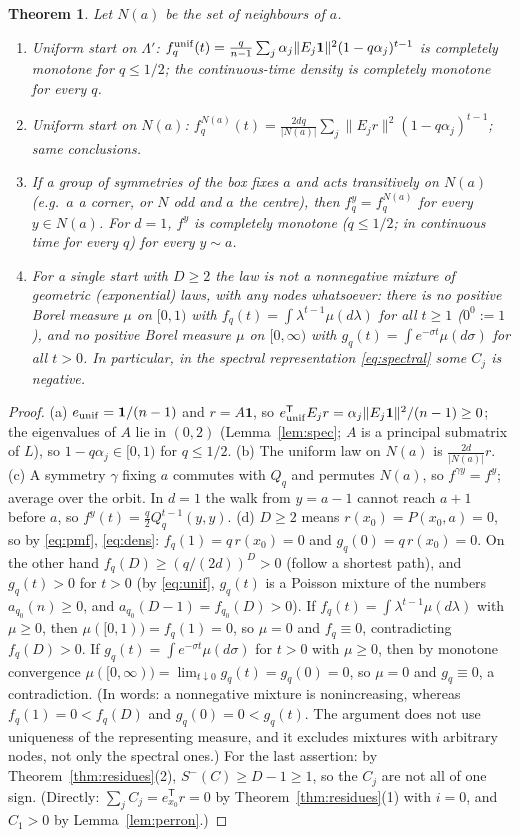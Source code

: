 \documentclass[11pt,a4paper]{article}
\newtheorem{theorem}{Theorem}[section]
\theoremstyle{definition}
\newcommand{\one}{\mathbf 1}
\newcommand{\Sm}{S^{-}}
\newcommand{\T}{^{\mathsf T}}
\begin{document}
\begin{theorem}\label{thm:cm}
Let $N(a)$ be the set of neighbours of $a$.
\begin{enumerate}
\item[(a)] Uniform start on $\Lambda'$: $f_q^{\rm unif}(t)=\frac q{n-1}\sum_j\alpha_j\|E_j\one\|^2(1-q\alpha_j)^{t-1}$ is completely monotone for $q\le1/2$; the continuous-time density is completely monotone for every $q$.
\item[(b)] Uniform start on $N(a)$: $f_q^{N(a)}(t)=\frac{2dq}{|N(a)|}\sum_j\|E_jr\|^2(1-q\alpha_j)^{t-1}$; same conclusions.
\item[(c)] If a group of symmetries of the box fixes $a$ and acts transitively on $N(a)$ (e.g.\ $a$ a corner, or $N$ odd and $a$ the centre), then $f_q^y=f_q^{N(a)}$ for every $y\in N(a)$. For $d=1$, $f^y$ is completely monotone ($q\le1/2$; in continuous time for every $q$) for every $y\sim a$.
\item[(d)] For a single start with $D\ge2$ the law is \emph{not} a nonnegative mixture of geometric (exponential) laws, with any nodes whatsoever: there is no positive Borel measure $\mu$ on $[0,1)$ with $f_q(t)=\int\lambda^{t-1}\mu(d\lambda)$ for all $t\ge1$ ($0^0:=1$), and no positive Borel measure $\mu$ on $[0,\infty)$ with $g_q(t)=\int e^{-\sigma t}\mu(d\sigma)$ for all $t>0$. In particular, in the spectral representation \eqref{eq:spectral} some $C_j$ is negative.
\end{enumerate}
\end{theorem}
\begin{proof}
(a) $e_{\rm unif}=\one/(n-1)$ and $r=A\one$, so $e_{\rm unif}\T E_jr=\alpha_j\|E_j\one\|^2/(n-1)\ge0$; the eigenvalues of $A$ lie in $(0,2)$ (Lemma~\ref{lem:spec}; $A$ is a principal submatrix of $L$), so $1-q\alpha_j\in[0,1)$ for $q\le1/2$. (b) The uniform law on $N(a)$ is $\frac{2d}{|N(a)|}r$. (c) A symmetry $\gamma$ fixing $a$ commutes with $Q_q$ and permutes $N(a)$, so $f^{\gamma y}=f^y$; average over the orbit. In $d=1$ the walk from $y=a-1$ cannot reach $a+1$ before $a$, so $f^y(t)=\frac q2Q_q^{t-1}(y,y)$. (d) $D\ge2$ means $r(x_0)=P(x_0,a)=0$, so by \eqref{eq:pmf}, \eqref{eq:dens}: $f_q(1)=q\,r(x_0)=0$ and $g_q(0)=q\,r(x_0)=0$. On the other hand $f_q(D)\ge(q/(2d))^D>0$ (follow a shortest path), and $g_q(t)>0$ for $t>0$ (by \eqref{eq:unif}, $g_q(t)$ is a Poisson mixture of the numbers $a_{q_0}(n)\ge0$, and $a_{q_0}(D-1)=f_{q_0}(D)>0$). If $f_q(t)=\int\lambda^{t-1}\mu(d\lambda)$ with $\mu\ge0$, then $\mu([0,1))=f_q(1)=0$, so $\mu=0$ and $f_q\equiv0$, contradicting $f_q(D)>0$. If $g_q(t)=\int e^{-\sigma t}\mu(d\sigma)$ for $t>0$ with $\mu\ge0$, then by monotone convergence $\mu([0,\infty))=\lim_{t\downarrow0}g_q(t)=g_q(0)=0$, so $\mu=0$ and $g_q\equiv0$, a contradiction. (In words: a nonnegative mixture is nonincreasing, whereas $f_q(1)=0<f_q(D)$ and $g_q(0)=0<g_q(t)$. The argument does not use uniqueness of the representing measure, and it excludes mixtures with arbitrary nodes, not only the spectral ones.) For the last assertion: by Theorem~\ref{thm:residues}(2), $\Sm(C)\ge D-1\ge1$, so the $C_j$ are not all of one sign. (Directly: $\sum_jC_j=e_{x_0}\T r=0$ by Theorem~\ref{thm:residues}(1) with $i=0$, and $C_1>0$ by Lemma~\ref{lem:perron}.)
\end{proof}
\end{document}
